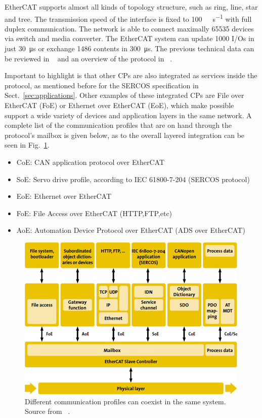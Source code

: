 EtherCAT supports almost all kinds of topology structure, such as ring, line, star and tree. The transmission speed of the interface is fixed to \SI{100}{\mega\bit\per\second}
with  full  duplex  communication.  The  network  is  able  to  connect  maximally 65535  devices  via  switch  and  media  converter.  
The  EtherCAT  system  can  update  1000  I/Os  in  just  \SI{30}{\micro\second} or  exchange \SI{1486}{\byte} contents in  \SI{300}{\micro\second}.
The previous technical data can be reviewed in ~\cite{beckhoff_datasheet} and an overview of the protocol in ~\cite{ecat_sercos}. %

Important to highlight is that other CPs are also integrated as services inside the protocol, as mentioned before for 
the SERCOS specification in Sect.~\ref{sec:applications}. 
Other examples of these integrated CPs are File over EtherCAT (FoE) or Ethernet over EtherCAT (EoE), which  
make possible support a wide variety of devices and application layers in the same network.
A complete list of the communication profiles that are on hand
through the protocol's mailbox is given below, as to the overall layered integration can be seen in Fig.~\ref{fig:ecatprofiles}.
\begin{itemize}
    \item CoE: CAN application protocol over EtherCAT
    \item SoE: Servo drive profile, according to IEC 61800-7-204 (SERCOS protocol)
    \item EoE: Ethernet over EtherCAT
    \item FoE: File Access over EtherCAT (HTTP,FTP,etc)
    \item AoE: Automation Device Protocol over EtherCAT (ADS over EtherCAT)
\end{itemize}

\begin{figure}[ht]
    \centering
    \includegraphics[width=.65\textwidth]{imgs/intro-ecatprofiles.jpg}
    \caption{Different communication profiles can coexist in the same system. Source from ~\cite{beckhoff_compatibility}.}
    \label{fig:ecatprofiles}
\end{figure}

